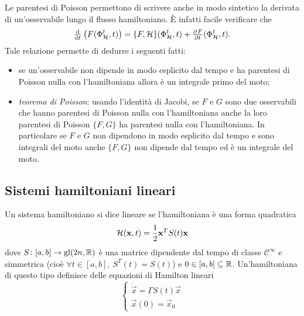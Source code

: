 Le parentesi di Poisson permettono di scrivere anche in modo sintetico la derivata di un'osservabile lungo il flusso hamiltoniano. È infatti facile verificare che
\begin{equation}
    \od{}{t} \left(F(\Phi_\ham^t, t)\right) = \{F, \ham\}(\Phi_\ham^t, t) + \pd{F}{t}(\Phi_\ham^t, t).
\end{equation}
Tale relazione permette di dedurre i seguenti fatti:
\begin{itemize}
    \item se un'osservabile non dipende in modo esplicito dal tempo e ha parentesi di Poisson nulla con l'hamiltoniana allora è un integrale primo del moto;
    \item \emph{teorema di Poisson}: usando l'identità di Jacobi, se $ F $ e $ G $ sono due osservabili che hanno parentesi di Poisson nulla con l'hamiltoniana anche la loro parentesi di Poisson $ \{F, G\} $ ha parentesi nulla con l'hamiltoniana. In particolare se $ F $ e $ G $ non dipendono in modo esplicito dal tempo e sono integrali del moto anche $ \{F, G\} $ non dipende dal tempo ed è un integrale del moto.
\end{itemize}

\subsection{Sistemi hamiltoniani lineari}

\begin{definition}
    Un sistema hamiltoniano si dice lineare se l'hamiltoniana è una forma quadratica
    \begin{equation}
        \mathcal{H}(\mathbf{x}, t) = \frac{1}{2} \mathbf{x}^T S(t) \mathbf{x}
    \end{equation}
    dove $ S \colon [a, b] \to \mathrm{gl}(2n, \mathbb{R}) $ è una matrice dipendente dal tempo di classe $ \mathcal{C}^\infty $ e simmetrica (cioè $ \forall t \in [a, b], \ S^T(t) = S(t) $) e $ 0 \in [a, b] \subseteq \mathbb{R} $. Un'hamiltoniana di questo tipo definisce delle equazioni di Hamilton lineari
    \begin{equation} \label{eqn:ham-lineare}
        \begin{cases}
            \dot{\vec{x}} = \Gamma S(t) \vec{x} \\
            \vec{x}(0) = \vec{x}_0
        \end{cases}
    \end{equation}
\end{definition}
\ \\

